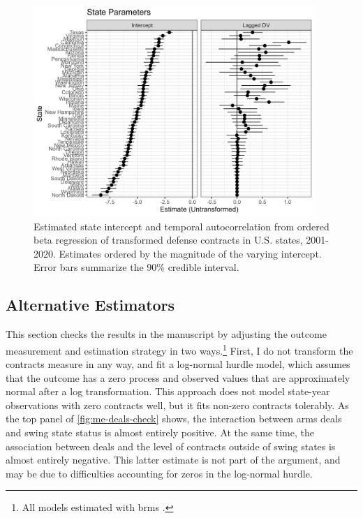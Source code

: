\documentclass[12pt]{article}
\begin{document}
\begin{figure}[htpb]
	\centering
		\includegraphics[width=0.95\textwidth]{state-pars.png}
	\caption{Estimated state intercept and temporal autocorrelation from ordered beta regression of transformed defense contracts in U.S. states, 2001-2020. Estimates ordered by the magnitude of the varying intercept. Error bars summarize the 90\% credible interval.}
	\label{fig:state-pars}
\end{figure}


\subsection{Alternative Estimators}

This section checks the results in the manuscript by adjusting the outcome measurement and estimation strategy in two ways.\footnote{All models estimated with brms \citep{Buerkner2017}.} 
First, I do not transform the contracts measure in any way, and fit a log-normal hurdle model, which assumes that the outcome has a zero process and observed values that are approximately normal after a log transformation. 
This approach does not model state-year observations with zero contracts well, but it fits non-zero contracts tolerably. 
As the top panel of \autoref{fig:me-deals-check} shows, the interaction between arms deals and swing state status is almost entirely positive.
At the same time, the association between deals and the level of contracts outside of swing states is almost entirely negative. 
This latter estimate is not part of the argument, and may be due to difficulties accounting for zeros in the log-normal hurdle. 
 
\end{document}
